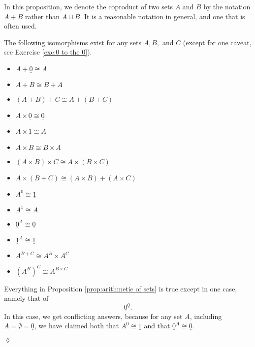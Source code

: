 \documentclass{book}
\def\iso{\cong}
\def\ul{\underline}
\theoremstyle{theoremENG}
\theoremstyle{lemmaENG}
\theoremstyle{propositionENG}
\newtheorem{propositionENG}[subsubsection]{\begin{english}Proposition\end{english}}
\theoremstyle{corollaryENG}
\theoremstyle{factENG}
\theoremstyle{remarkENG}
\theoremstyle{exampleENG}
\theoremstyle{warningENG}
\theoremstyle{questionENG}
\theoremstyle{guessENG}
\theoremstyle{answerENG}
\theoremstyle{constructionENG}
\theoremstyle{rulesENG}
\theoremstyle{excENG}
\newtheorem{excENG}[subsubsection]{\begin{english}Exercise\end{english}}
\theoremstyle{appENG}
\theoremstyle{definitionENG}
\theoremstyle{notationENG}
\theoremstyle{conjectureENG}
\theoremstyle{postulateENG}
\newenvironment{exerciseENG}{\begin{excENG}}{\hspace*{\fill}$\lozenge$\end{excENG}}
\theoremstyle{theoremRUS}
\theoremstyle{lemmaRUS}
\theoremstyle{propositionRUS}
\theoremstyle{corollaryRUS}
\theoremstyle{factRUS}
\theoremstyle{remarkRUS}
\theoremstyle{exampleRUS}
\theoremstyle{warningRUS}
\theoremstyle{questionRUS}
\theoremstyle{guessRUS}
\theoremstyle{answerRUS}
\theoremstyle{constructionRUS}
\theoremstyle{rulesRUS}
\theoremstyle{excRUS}
\theoremstyle{appRUS}
\theoremstyle{definitionRUS}
\theoremstyle{notationRUS}
\theoremstyle{conjectureRUS}
\theoremstyle{postulateRUS}
\begin{document}
\begin{english}
\begin{russian} \end{russian}

In this proposition, we denote the coproduct of two sets $A$ and $B$ by the notation $A+B$ rather than $A\sqcup B$. It is a reasonable notation in general, and one that is often used. 

\begin{propositionENG}\label{prop:arithmetic of sets}

The following isomorphisms exist for any sets $A,B,$ and $C$ (except for one caveat, see Exercise \ref{exc:0 to the 0}). 
\begin{russian} \end{russian}
\begin{itemize}
\item $A+\ul{0}\iso A$
\item $A + B\iso B + A$
\item $(A + B) + C \iso A + (B + C)$
\item $A\times\ul{0}\iso\ul{0}$
\item $A\times\ul{1}\iso A$
\item $A\times B\iso B\times A$
\item $(A\times B)\times C \iso A\times (B\times C)$
\item $A\times(B+C)\iso (A\times B)+(A\times C)$
\item $A^{\ul{0}}\iso \ul{1}$
\item $A^{\ul{1}}\iso A$
\item $\ul{0}^A\iso\ul{0}$
\item $\ul{1}^A\iso\ul{1}$
\item $A^{B+C}\iso A^B\times A^C$
\item $(A^B)^C\iso A^{B\times C}$
\end{itemize}

\end{propositionENG}

\begin{exerciseENG}\label{exc:0 to the 0}

Everything in Proposition \ref{prop:arithmetic of sets} is true except in one case, namely that of $$\ul{0}^{\ul{0}}.$$ In this case, we get conflicting answers, because for any set $A$, including $A=\emptyset=\ul{0}$, we have claimed both that $A^{\ul{0}}\iso\ul{1}$ and that $\ul{0}^A\iso\ul{0}.$ 

\begin{russian} \end{russian}


\end{exerciseENG}
\end{english}
\end{document}
